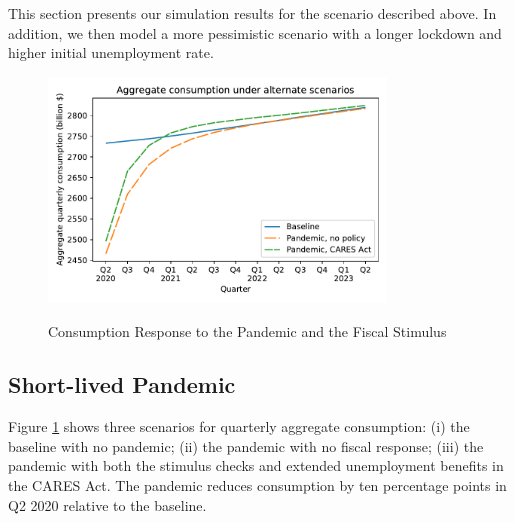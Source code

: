 \documentclass[titlepage,letterpaper]{\econtex}
\begin{document}
This section presents our simulation results for the scenario described above. In addition, we then model a more pessimistic scenario with a longer lockdown and higher initial unemployment rate.
\hypertarget{cons-response}{}

\begin{figure}
  \centering
  \caption{Consumption Response to the Pandemic and the Fiscal Stimulus}
  \label{cons_response}
  { \includegraphics[width=0.8\textwidth]{./Figures/AggConResp_examples}}
\end{figure}

\subsection{Short-lived Pandemic}

Figure \ref{cons_response} shows three scenarios for quarterly aggregate consumption: (i) the baseline with no pandemic; (ii) the pandemic with no fiscal response; (iii) the pandemic with both the stimulus checks and extended unemployment benefits in the CARES Act.
The pandemic reduces consumption by ten percentage points in Q2 2020 relative to the baseline.
\end{document}

